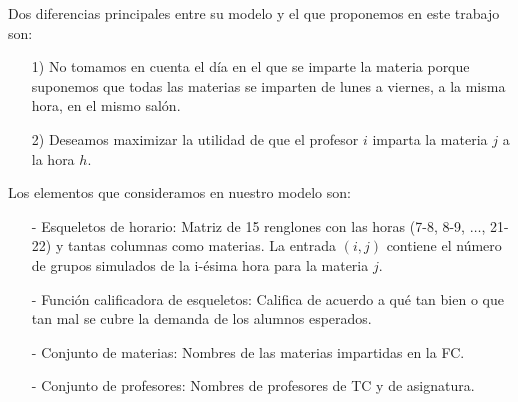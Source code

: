 Dos diferencias principales entre su modelo y el que proponemos en este trabajo son:
  
  \begin{enumerate}
\item[1)] No tomamos en cuenta el día en el que se imparte la materia porque suponemos que todas las materias se imparten de lunes a viernes, a la misma hora, en el mismo salón.

\item[2)] Deseamos maximizar la utilidad de que el profesor $i$ imparta la materia $j$ a la hora $h$.
\end{enumerate}

  
  Los elementos que consideramos en nuestro modelo son:
  
  \begin{itemize}
\item[-] Esqueletos de horario: Matriz de 15 renglones con las horas (7-8, 8-9, $\ldots$, 21-22) y tantas columnas como materias. La entrada $(i,j)$ contiene el número de grupos simulados de la i-ésima hora para la materia $j$.

\item[-] Función calificadora de esqueletos: Califica de acuerdo a qué tan bien o que tan mal se cubre la demanda de los alumnos esperados.

\item[-] Conjunto de materias: Nombres de las materias impartidas en la FC.

\item[-] Conjunto de profesores: Nombres de profesores de TC y de asignatura.
\end{itemize}

